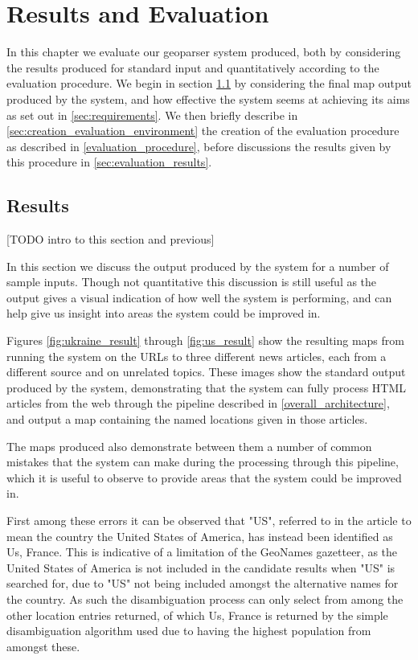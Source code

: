 \documentclass[12pt, a4paper]{report}
\begin{document}
\chapter{Results and Evaluation}

In this chapter we evaluate our geoparser system produced, both by considering the results produced for standard input and quantitatively according to the evaluation procedure. We begin in section \ref{sec:results} by considering the final map output produced by the system, and how effective the system seems at achieving its aims as set out in \ref{sec:requirements}. We then briefly describe in \ref{sec:creation_evaluation_environment} the creation of the evaluation procedure as described in \ref{evaluation_procedure}, before discussions the results given by this procedure in \ref{sec:evaluation_results}.

\section{Results}
\label{sec:results}

[TODO intro to this section and previous]

In this section we discuss the output produced by the system for a number of sample inputs. Though not quantitative this discussion is still useful as the output gives a visual indication of how well the system is performing, and can help give us insight into areas the system could be improved in.

Figures \ref{fig:ukraine_result} through \ref{fig:us_result} show the resulting maps from running the system on the URLs to three different news articles, each from a different source and on unrelated topics. These images show the standard output produced by the system, demonstrating that the system can fully process HTML articles from the web through the pipeline described in \ref{overall_architecture}, and output a map containing the named locations given in those articles.

The maps produced also demonstrate between them a number of common mistakes that the system can make during the processing through this pipeline, which it is useful to observe to provide areas that the system could be improved in.

First among these errors it can be observed that "US", referred to in the article to mean the country the United States of America, has instead been identified as Us, France. This is indicative of a limitation of the GeoNames gazetteer, as the United States of America is not included in the candidate results when "US" is searched for, due to "US" not being included amongst the alternative names for the country. As such the disambiguation process can only select from among the other location entries returned, of which Us, France is returned by the simple disambiguation algorithm used due to having the highest population from amongst these.
\end{document}
